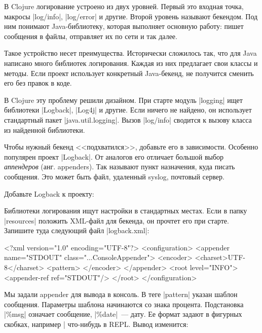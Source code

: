 
В Clojure логирование устроено из двух уровней. Первый это входная точка,
макросы \spverb|log/info|, \spverb|log/error| и другие. Второй уровень называют
бекендом. Под ним понимают Java-библиотеку, которая выполняет основную работу:
пишет сообщения в файлы, отправляет их по сети и так далее.

Такое устройство несет преимущества. Исторически сложилось так, что для Java
написано много библиотек логирования. Каждая из них предлагает свои классы и
методы. Если проект использует конкретный Java-бекенд, не получится сменить его
без правок в коде.

В Clojure эту проблему решили дизайном. При старте модуль \spverb|logging| ищет
библиотеки \spverb|Logback|, \spverb|Log4j| и другие. Если ничего не найдено, он
использует стандартный пакет \spverb|java.util.logging|. Вызов \spverb|log/info|
сводится к вызову класса из найденной библиотеки.

Чтобы нужный бекенд <<подхватился>>, добавьте его в зависимости. Особенно
популярен проект \spverb|Logback|. От аналогов его отличает большой выбор
\emph{аппендеров} (анг. appenders). Так называют пункт назначения, куда писать
сообщения. Это может быть файл, удаленный syslog, почтовый сервер.

Добавьте Logback к проекту:

\begin{english}
  \begin{clojure}
  \end{clojure}
\end{english}

Библиотеки логирования ищут настройки в стандартных местах. Если в папку
\spverb|resources| положить XML-файл для бекенда, он прочтет его при
старте. Запишите туда следующий файл \spverb|logback.xml|:

\begin{english}
  \begin{xml}
<?xml version="1.0" encoding="UTF-8"?>
<configuration>
  <appender name="STDOUT" class="...ConsoleAppender">
    <encoder>
      <charset>UTF-8</charset>
      <pattern>%
    </encoder>
  </appender>
  <root level="INFO">
    <appender-ref ref="STDOUT"/>
  </root>
</configuration>
  \end{xml}
\end{english}

Мы задали appender для вывода в консоль. В теге \spverb|pattern| указан
шаблон сообщения. Параметры шаблона начинаются со знака процента. Подстановка
\spverb|\%msg| означает сообщение, \spverb|\%date|~--- дату. Ее формат
задают в фигурных скобках, например \spverb|%
что-нибудь в REPL. Вывод изменится:

